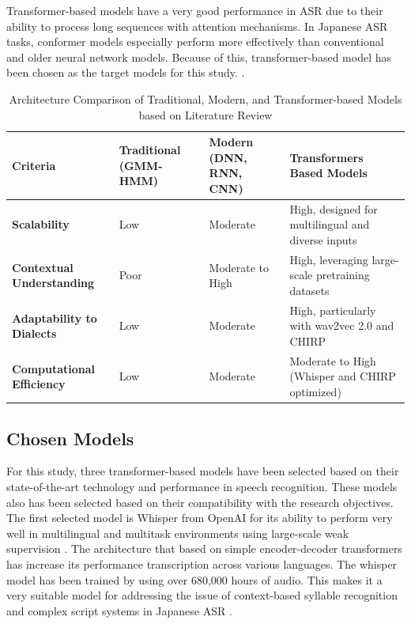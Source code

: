 Transformer-based models have a very good performance in ASR due to their ability to process long sequences with attention mechanisms. In Japanese ASR tasks, conformer models especially perform more effectively than conventional and older neural network models. Because of this, transformer-based model has been chosen as the target models for this study. .

\begin{table}[H]
    \centering
    \caption{Architecture Comparison of Traditional, Modern, and Transformer-based Models based on Literature Review} 
    \begin{tabular}{p{2.5cm}|p{3.5cm}|p{3.5cm}|p{3.5cm}}
    \hline
    \textbf{Criteria} & \textbf{Traditional (GMM-HMM)} & \textbf{Modern (DNN, RNN, CNN)} & \textbf{Transformers Based Models} \\ \hline
    \textbf{Scalability} & Low & Moderate & High, designed for multilingual and diverse inputs \\ \hline
    \textbf{Contextual Understanding} & Poor & Moderate to High & High, leveraging large-scale pretraining datasets \\ \hline
    \textbf{Adaptability to Dialects} & Low & Moderate & High, particularly with wav2vec 2.0 and CHIRP \\ \hline
    \textbf{Computational Efficiency} & Low & Moderate & Moderate to High (Whisper and CHIRP optimized) \\ \hline
    \end{tabular}
    \label{tab:comparison_models}
\end{table}  

\subsection{Chosen Models}
For this study, three transformer-based models have been selected based on their state-of-the-art technology and performance in speech recognition. These models also has been selected based on their compatibility with the research objectives. The first selected model is Whisper from OpenAI for its ability to perform very well in multilingual and multitask environments using large-scale weak supervision \parencite{radford2023robust}. The architecture that based on simple encoder-decoder transformers has increase its performance transcription across various languages. The whisper model has been trained by using over 680,000 hours of audio. This makes it a very suitable model for addressing the issue of context-based syllable recognition and complex script systems in Japanese ASR \parencite{bajo2024efficient}. 
 
